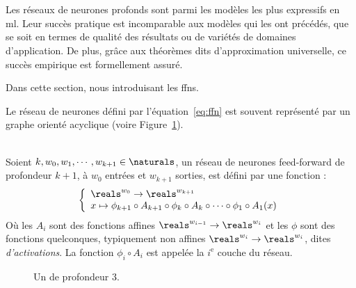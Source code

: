 
\section{}

Les réseaux de neurones profonds sont parmi les modèles les plus expressifs en \acrshort{ml}.
Leur succès pratique est incomparable aux modèles qui les ont précédés, 
que se soit en termes de qualité des résultats ou de variétés de domaines d'application.
De plus, grâce aux théorèmes dits d'approximation universelle, ce succès empirique est formellement assuré.

Dans cette section, nous introduisant les \Glspl{ffn}.




Le réseau de neurones défini par l'équation~\ref{eq:ffn} 
est souvent représenté par un graphe orienté acyclique (voire Figure~\ref{fig:ffn}).


\begin{definition}\ \\
    \label{def:ffn}
    Soient \(k, w_0, w_1, \cdots, w_{k+1}\in\naturals\), 
    un réseau de neurones feed-forward de profondeur \(k+1\), à \(w_0\) entrées et \(w_{k+1}\) sorties, 
    est défini par une fonction :
    \begin{equation}
        \label{eq:ffn}
        \left\{
        \begin{array}{l}
            \reals^{w_0} \to \reals^{w_{k+1}}\\
            x\mapsto
            \phi_{k+1} \circ A_{k+1} \circ \phi_k \circ A_k \circ \cdots \circ \phi_1 \circ A_1(x)
        \end{array}
        \right.
    \end{equation}
    Où les \(A_i\) sont des fonctions affines \(\reals^{w_{i-1}}\to\reals^{w_i}\) 
    et les \(\phi\) sont des fonctions quelconques, typiquement non affines
    \(\reals^{w_i}\to\reals^{w_i}\), dites \emph{d'activations}.
    La fonction \(\phi_i\circ A_i\) est appelée la \(i^{\mathrm{e}}\) couche du réseau.


\end{definition}
\begin{figure}[hbt]
    \begin{center}
        
    \end{center}
    \caption{Un  de profondeur 3.}
    \label{fig:ffn}
\end{figure}
